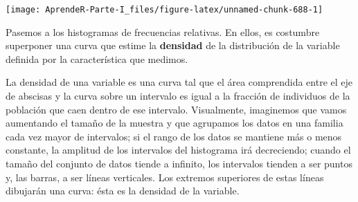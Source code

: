 \documentclass[]{book}
\newenvironment{Shaded}{\begin{snugshade}}{\end{snugshade}}
\newcommand{\ControlFlowTok}[1]{\textcolor[rgb]{0.13,0.29,0.53}{\textbf{#1}}}
\newcommand{\DataTypeTok}[1]{\textcolor[rgb]{0.13,0.29,0.53}{#1}}
\newcommand{\DecValTok}[1]{\textcolor[rgb]{0.00,0.00,0.81}{#1}}
\newcommand{\FloatTok}[1]{\textcolor[rgb]{0.00,0.00,0.81}{#1}}
\newcommand{\KeywordTok}[1]{\textcolor[rgb]{0.13,0.29,0.53}{\textbf{#1}}}
\newcommand{\NormalTok}[1]{#1}
\newcommand{\OperatorTok}[1]{\textcolor[rgb]{0.81,0.36,0.00}{\textbf{#1}}}
\newcommand{\OtherTok}[1]{\textcolor[rgb]{0.56,0.35,0.01}{#1}}
\newcommand{\StringTok}[1]{\textcolor[rgb]{0.31,0.60,0.02}{#1}}
\theoremstyle{definition}
\theoremstyle{definition}
\theoremstyle{definition}
\theoremstyle{remark}
\begin{document}
\begin{Shaded}
\end{Shaded}

\begin{center}\texttt{[image: AprendeR-Parte-I\_files/figure-latex/unnamed-chunk-688-1]} \end{center}

Pasemos a los histogramas de frecuencias relativas. En ellos, es costumbre superponer una curva que estime la \textbf{densidad} de la
distribución de la variable definida por la característica que medimos.

La densidad de una variable es una curva tal que el área comprendida entre el eje de abscisas y la curva sobre un intervalo es igual a la fracción de individuos de la población que caen dentro de ese intervalo. Visualmente,
imaginemos que vamos aumentando el tamaño de la muestra y que agrupamos los datos
en una familia cada vez mayor de intervalos; si el rango de los datos se mantiene más o menos constante, la amplitud de los
intervalos del histograma irá decreciendo; cuando el tamaño del conjunto de datos tiende a infinito,
los intervalos tienden a ser puntos y, las barras, a ser líneas verticales. Los extremos superiores de estas líneas dibujarán una curva: ésta es la densidad de la variable.
\end{document}
